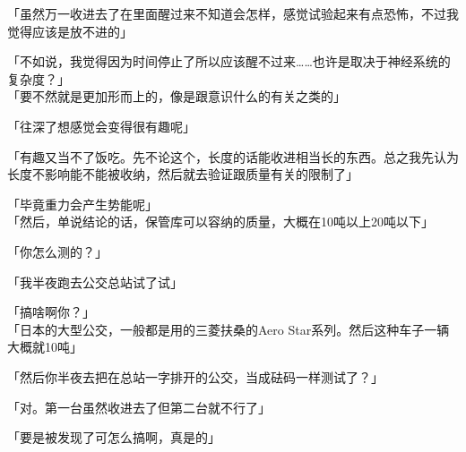 「虽然万一收进去了在里面醒过来不知道会怎样，感觉试验起来有点恐怖，不过我觉得应该是放不进的」

「不如说，我觉得因为时间停止了所以应该醒不过来……也许是取决于神经系统的复杂度？」\\

「要不然就是更加形而上的，像是跟意识什么的有关之类的」

「往深了想感觉会变得很有趣呢」

「有趣又当不了饭吃。先不论这个，长度的话能收进相当长的东西。总之我先认为长度不影响能不能被收纳，然后就去验证跟质量有关的限制了」

「毕竟重力会产生势能呢」\\

「然后，单说结论的话，保管库可以容纳的质量，大概在10吨以上20吨以下」

「你怎么测的？」

「我半夜跑去公交总站试了试」

「搞啥啊你？」\\

「日本的大型公交，一般都是用的三菱扶桑的Aero Star系列。然后这种车子一辆大概就10吨」

「然后你半夜去把在总站一字排开的公交，当成砝码一样测试了？」

「对。第一台虽然收进去了但第二台就不行了」

「要是被发现了可怎么搞啊，真是的」\\

